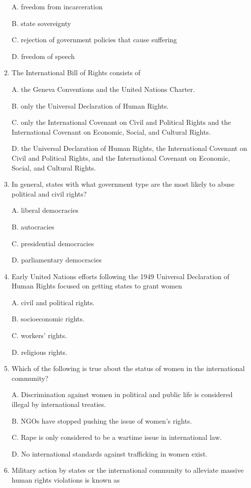 \documentclass[
]{book}
\begin{document}
\begin{enumerate}
  A. freedom from incarceration

  B. state sovereignty

  C. rejection of government policies that cause suffering

  D. freedom of speech
\item
  The International Bill of Rights consists of

  A. the Geneva Conventions and the United Nations Charter.

  B. only the Universal Declaration of Human Rights.

  C. only the International Covenant on Civil and Political Rights and the International Covenant on Economic, Social, and Cultural Rights.

  D. the Universal Declaration of Human Rights, the International Covenant on Civil and Political Rights, and the International Covenant on Economic, Social, and Cultural Rights.
\item
  In general, states with what government type are the most likely to abuse political and civil rights?

  A. liberal democracies

  B. autocracies

  C. presidential democracies

  D. parliamentary democracies
\item
  Early United Nations efforts following the 1949 Universal Declaration of Human Rights focused on getting states to grant women

  A. civil and political rights.

  B. socioeconomic rights.

  C. workers' rights.

  D. religious rights.
\item
  Which of the following is true about the status of women in the international community?

  A. Discrimination against women in political and public life is considered illegal by international treaties.

  B. NGOs have stopped pushing the issue of women's rights.

  C. Rape is only considered to be a wartime issue in international law.

  D. No international standards against trafficking in women exist.
\item
  Military action by states or the international community to alleviate massive human rights violations is known as


\end{enumerate}
\end{document}
